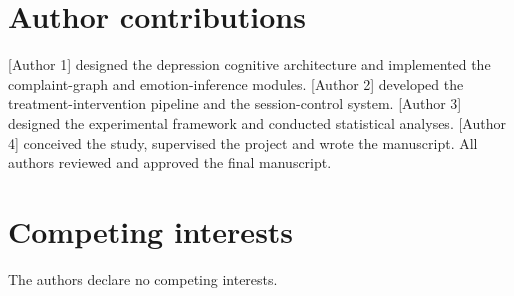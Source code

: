 \documentclass[sn-nature,pdflatex]{sn-jnl}
\begin{document}
\section*{Author contributions}

[Author 1] designed the depression cognitive architecture and implemented the complaint-graph and emotion-inference modules. [Author 2] developed the treatment-intervention pipeline and the session-control system. [Author 3] designed the experimental framework and conducted statistical analyses. [Author 4] conceived the study, supervised the project and wrote the manuscript. All authors reviewed and approved the final manuscript.

\section*{Competing interests}

The authors declare no competing interests.


\end{document}
